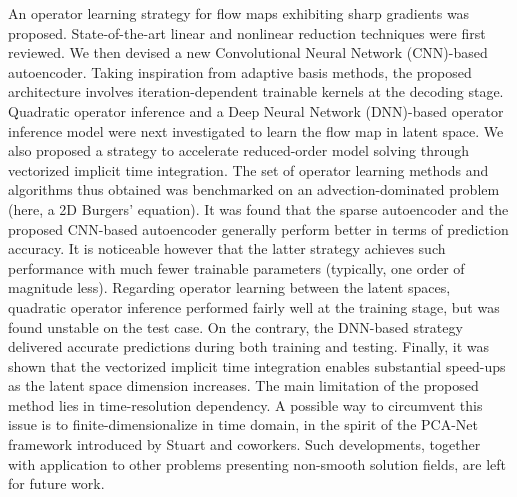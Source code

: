 An operator learning strategy for flow maps exhibiting sharp gradients was proposed. State-of-the-art linear and nonlinear reduction techniques were first reviewed. We then devised a new Convolutional Neural Network (CNN)-based autoencoder. Taking inspiration from adaptive basis methods, the proposed architecture involves iteration-dependent trainable kernels at the decoding stage. Quadratic operator inference and a Deep Neural Network (DNN)-based operator inference model were next investigated to learn the flow map in latent space. We also proposed a strategy to accelerate reduced-order model solving through vectorized implicit time integration. The set of operator learning methods and algorithms thus obtained was benchmarked on an advection-dominated problem (here, a 2D Burgers' equation). It was found that the sparse autoencoder and the proposed CNN-based autoencoder generally perform better in terms of prediction accuracy. It is noticeable however that the latter strategy achieves such performance with much fewer trainable parameters (typically, one order of magnitude less). Regarding operator learning between the latent spaces, quadratic operator inference performed fairly well at the training stage, but was found unstable on the test case. On the contrary, the DNN-based strategy delivered accurate predictions during both training and testing. Finally, it was shown that the vectorized implicit time integration enables substantial speed-ups as the latent space dimension increases. The main limitation of the proposed method lies in time-resolution dependency. A possible way to circumvent this issue is to finite-dimensionalize in time domain, in the spirit of the PCA-Net framework introduced by Stuart and coworkers. Such developments, together with application to other problems presenting non-smooth solution fields, are left for future work.

